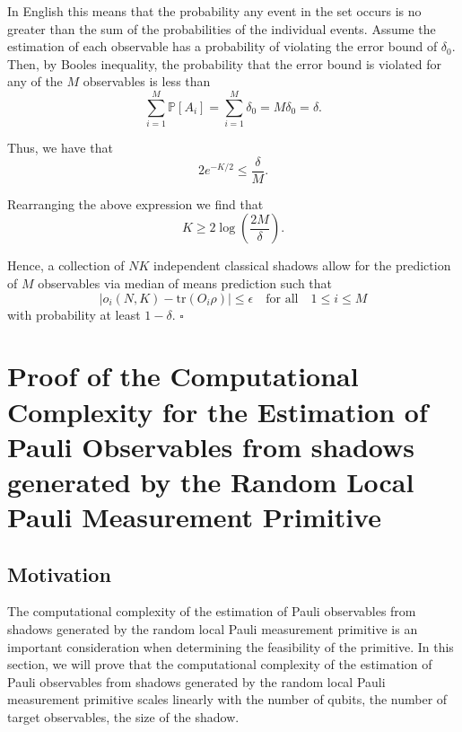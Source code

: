 \documentclass[12pt]{article}
\begin{document}
    In English this means that the probability any event in the set occurs is no greater than the sum of the probabilities of the individual events. Assume the estimation of each observable has a probability of violating the error bound of $\delta_0$. Then, by Booles inequality, the probability that the error bound is violated for any of the $M$ observables is less than
    \begin{equation*}
        \sum_{i=1}^M \mathbb{P}[A_i] = \sum_{i=1}^M \delta_0 = M\delta_0 = \delta.
    \end{equation*}

    Thus, we have that
    \begin{equation*}
        2e^{-K/2} \leq \frac{\delta}{M}.
    \end{equation*}

    Rearranging the above expression we find that
    \begin{equation*}
        K \geq 2\log{\left(\frac{2M}{\delta}\right)}.
    \end{equation*}

    Hence, a collection of $NK$ independent classical shadows allow for the prediction of $M$ observables via median of means prediction such that
    \begin{equation*}
        |\hat{o}_i(N,K) - \text{tr}(O_i\rho)| \leq \epsilon \quad \text{for all} \quad 1 \leq i \leq M
    \end{equation*}
    with probability at least $1-\delta$.
    \hfill $\square$

    \section{Proof of the Computational Complexity for the Estimation of Pauli Observables from shadows generated by the Random Local Pauli Measurement Primitive}
    \subsection{Motivation}
    The computational complexity of the estimation of Pauli observables from shadows generated by the random local Pauli measurement primitive is an important consideration when determining the feasibility of the primitive. In this section, we will prove that the computational complexity of the estimation of Pauli observables from shadows generated by the random local Pauli measurement primitive scales linearly with the number of qubits, the number of target observables, the size of the shadow.
\end{document}
